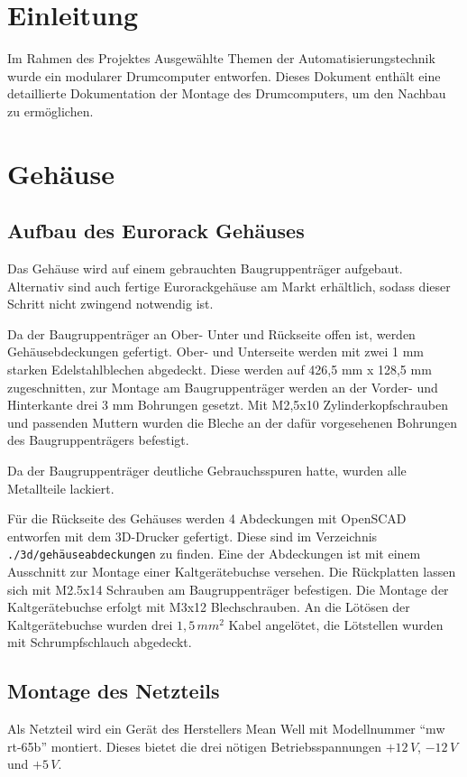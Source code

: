 \section{Einleitung}
Im Rahmen des Projektes Ausgewählte Themen der Automatisierungstechnik wurde ein modularer Drumcomputer entworfen.
Dieses Dokument enthält eine detaillierte Dokumentation der Montage des Drumcomputers, um den Nachbau zu ermöglichen.

\section{Gehäuse}
\subsection*{Aufbau des Eurorack Gehäuses}
Das Gehäuse wird auf einem gebrauchten Baugruppenträger aufgebaut.
Alternativ sind auch fertige Eurorackgehäuse am Markt erhältlich, sodass dieser Schritt nicht zwingend notwendig ist.

Da der Baugruppenträger an Ober- Unter und Rückseite offen ist, werden Gehäusebdeckungen gefertigt.
Ober- und Unterseite werden mit zwei 1 mm starken Edelstahlblechen abgedeckt.
Diese werden auf 426,5 mm x 128,5 mm zugeschnitten, zur Montage am Baugruppenträger werden an der Vorder- und Hinterkante drei 3 mm Bohrungen gesetzt. Mit M2,5x10 Zylinderkopfschrauben und passenden Muttern wurden die Bleche an der dafür vorgesehenen Bohrungen des Baugruppenträgers befestigt.

Da der Baugruppenträger deutliche Gebrauchsspuren hatte, wurden alle Metallteile lackiert.

Für die Rückseite des Gehäuses werden 4 Abdeckungen mit OpenSCAD entworfen mit dem 3D-Drucker gefertigt.
Diese sind im Verzeichnis \texttt{./3d/gehäuseabdeckungen} zu finden.
Eine der Abdeckungen ist mit einem Ausschnitt zur Montage einer Kaltgerätebuchse versehen.
Die Rückplatten lassen sich mit M2.5x14 Schrauben am Baugruppenträger befestigen.
Die Montage der Kaltgerätebuchse erfolgt mit M3x12 Blechschrauben.
An die Lötösen der Kaltgerätebuchse wurden drei $1,5\,\unit{mm^2}$ Kabel angelötet, die Lötstellen wurden mit Schrumpfschlauch abgedeckt.


\subsection*{Montage des Netzteils}
Als Netzteil wird ein Gerät des Herstellers Mean Well mit Modellnummer \enquote{mw rt-65b} montiert.
Dieses bietet die drei nötigen Betriebsspannungen $+12\,\unit{V}$, $-12\,\unit{V}$ und $+5\,\unit{V}$.

